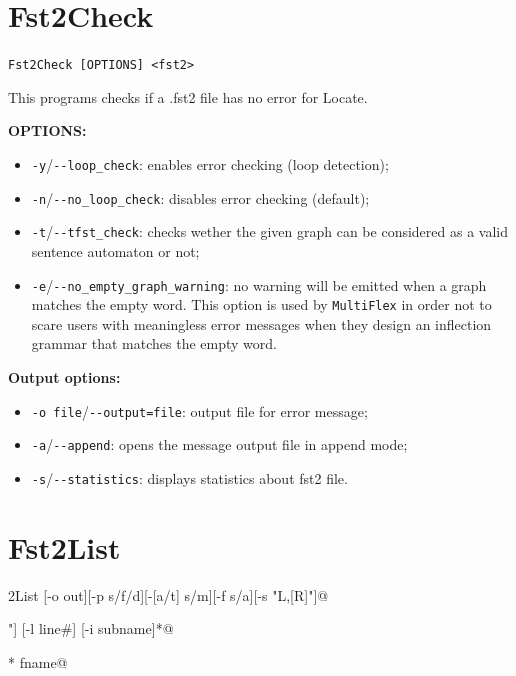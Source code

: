 \section{Fst2Check}
\verb+Fst2Check [OPTIONS] <fst2>+

\bigskip
\noindent This programs checks if a .fst2 file has no error for Locate.

\bigskip
\noindent \textbf{OPTIONS:}
\begin{itemize}
  \item \verb+-y+/\verb+--loop_check+: enables error checking (loop
  detection);
  \item \verb+-n+/\verb+--no_loop_check+: disables error checking (default);
  \item \verb+-t+/\verb+--tfst_check+: checks wether the given graph can be
  considered as a valid sentence automaton or not;
  \item \verb+-e+/\verb+--no_empty_graph_warning+: no warning will be emitted
  when a graph matches the empty word. This option is used by \verb+MultiFlex+
  in order not to scare users with meaningless error messages when they design
  an inflection grammar that matches the empty word.
\end{itemize}

\bigskip
\noindent \textbf{Output options:}
\begin{itemize}
  \item \verb+-o file+/\verb+--output=file+: output file for error message;
  \item \verb+-a+/\verb+--append+: opens the message output file in append mode;
  \item \verb+-s+/\verb+--statistics+: displays statistics about fst2 file.
\end{itemize}








\section{Fst2List}
\verb@Fst2List [-o out][-p s/f/d][-[a/t] s/m][-f s/a][-s "L,[R]"]@

\verb@         [-s0 "Str"][-v][-rx "L,[R]"] [-l line#] [-i subname]*@

\verb@         [-c SS=0xxxx]* fname@

